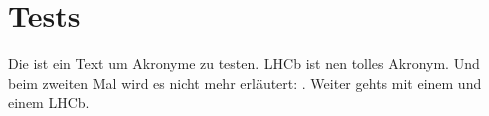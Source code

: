 
\section{Tests}

Die ist ein Text um Akronyme zu testen. \Ac{LHCb} ist nen tolles Akronym. Und beim zweiten Mal wird es nicht mehr erläutert: \CERN. Weiter gehts mit einem \CERN und einem \ac{LHCb}.